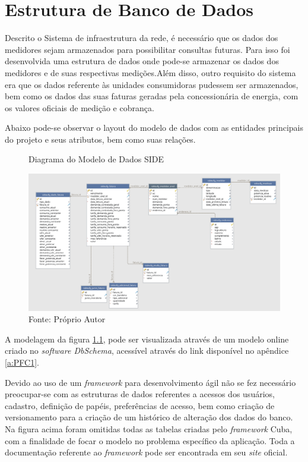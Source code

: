 \chapter{Estrutura de Banco de Dados}
\label{c:estrutura_de_banco_de_dados}
Descrito o Sistema de infraestrutura da rede, é necessário que os dados dos medidores sejam armazenados para possibilitar consultas futuras. Para isso foi desenvolvida uma estrutura de dados onde pode-se armazenar os dados dos medidores e de suas respectivas medições.Além disso, outro requisito do sistema era que os dados referente às unidades consumidoras pudessem ser armazenados, bem como os dados das suas faturas geradas pela concessionária de energia, com os valores oficiais de medição e cobrança.

Abaixo pode-se observar o layout do modelo de dados com as entidades principais do projeto e seus atributos, bem como suas relações.

\begin{figure}[H]
    \centering
    \caption{Diagrama do Modelo de Dados SIDE}
\includegraphics[width=\linewidth]{imagens/modelo-de-dados-side.png}
    \caption*{Fonte: Próprio Autor}
    \label{fig:diagrama-modelo-dados}
\end{figure}

A modelagem da figura \ref{fig:diagrama-modelo-dados}, pode ser visualizada através de um modelo online criado no \textit{software DbSchema}, acessível através do link disponível no apêndice \ref{a:PFC1}.


Devido ao uso de um \textit{framework} para desenvolvimento ágil não se fez necessário preocupar-se com as estruturas de dados referentes a acessos dos usuários, cadastro, definição de papéis, preferências de acesso, bem como criação de versionamento para a criação de um histórico de alteração dos dados do banco. Na figura acima foram omitidas todas as tabelas criadas pelo \textit{framework} Cuba, com a finalidade de focar o modelo no problema específico da aplicação. Toda a documentação referente ao \textit{framework} pode ser encontrada em seu \textit{site} oficial.

